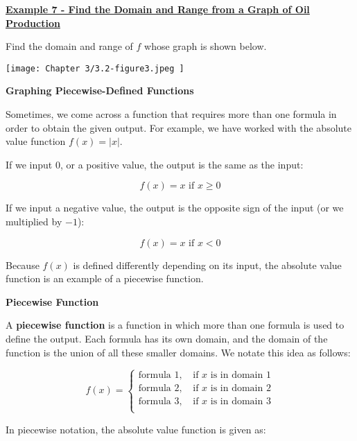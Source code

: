 \documentclass[12pt]{book}
\begin{document}
\newpage

\underline{\textbf{Example 7 - Find the Domain and Range from a Graph of Oil Production}}

Find the domain and range of $f$ whose graph is shown below. 
\\

\centerline{ \texttt{[image: Chapter 3/3.2-figure3.jpeg ]}}
\newpage

{\large \textbf{Graphing Piecewise-Defined Functions}}

Sometimes, we come across a function that requires more than one formula in order to obtain the given output. For example, we have worked with the absolute value function $f(x)= |x|$. 

If we input $0$, or a positive value, the output is the same as the input: 

$$ f(x) = x \text{ if } x \geq 0$$

If we input a negative value, the output is the opposite sign of the input (or we multiplied by $-1$):

$$ f(x) = x \text{ if } x < 0$$


Because $f(x)$  is defined differently depending on its input, the absolute value function is an example of a piecewise function.
\\

\begin{boxR}
    \textbf{Piecewise Function}
    \vspace{1mm}
    \hline
    \vspace{2mm}
    
A \textbf{piecewise function} is a function in which more than one formula is used to define the output. Each formula has its own domain, and the domain of the function is the union of all these smaller domains. We notate this idea as follows:

$$f(x) = \begin{cases} 
   \text{formula 1}, & \text{ if } x \text{ is in domain } 1 \\ 
    \text{formula 2}, & \text{ if } x \text{ is in domain } 2 \\ 
    \text{formula 3}, & \text{ if } x \text{ is in domain } 3 \\ 
    \end{cases} $$
\end{boxR}


In piecewise notation, the absolute value function is given as: 

\newpage
\end{document}
